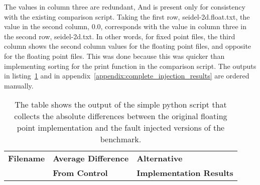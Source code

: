 The values in column three are redundant, And is present only for consistency with the existing comparison script. Taking the first row, seidel-2d.float.txt, the value in the second column, 0.0, corresponds with the value in column three in the second row, seidel-2d.txt. In other words, for fixed point files, the third column shows the second column values for the floating point files, and opposite for the floating point files. This was done because this was quicker than implementing sorting for the print function in the comparison script. The outputs in listing~\ref{lst:injection_results} and in appendix~\ref{appendix:complete_injection_results} are ordered manually.


\begin{longtable}{lll}
\label{lst:injection_results}\\
\caption{The table shows the output of the simple python script that collects the absolute differences between the original floating point implementation and the fault injected versions of the benchmark.}
{\bf Filename} & {\bf Average Difference} & {\bf Alternative } \\
             & {\bf From Control }      & {\bf Implementation Results}\\
 

\end{longtable}
